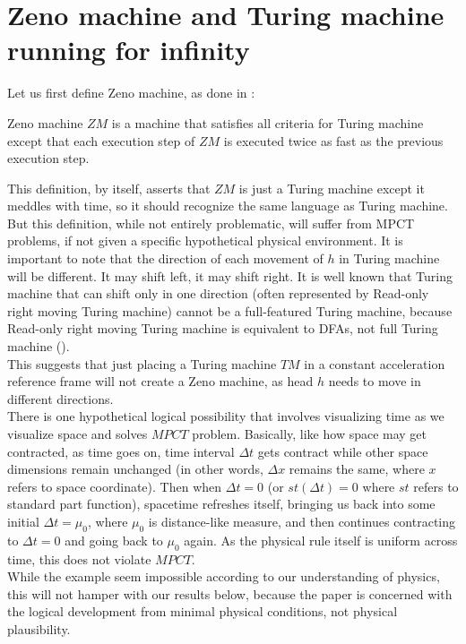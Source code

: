 \documentclass{roffin}
\begin{document}
\section{Zeno machine and Turing machine running for infinity}
Let us first define Zeno machine, as done in \cite{potgieter06}:
\begin{definition}
Zeno machine $ZM$ is a machine that satisfies all criteria for Turing machine except that each execution step of $ZM$ is executed twice as fast as the previous execution step.
\end{definition}
This definition, by itself, asserts that $ZM$ is just a Turing machine except it meddles with time, so it should recognize the same language as Turing machine.\\
But this definition, while not entirely problematic, will suffer from MPCT problems, if not given a specific hypothetical physical environment. It is important to note that the direction of each movement of $h$ in Turing machine will be different. It may shift left, it may shift right. It is well known that Turing machine that can shift only in one direction (often represented by Read-only right moving Turing machine) cannot be a full-featured Turing machine, because Read-only right moving Turing machine is equivalent to DFAs, not full Turing machine (\cite{tucker04}).\\
This suggests that just placing a Turing machine $TM$ in a constant acceleration reference frame will not create a Zeno machine, as head $h$ needs to move in different directions. \\
There is one hypothetical logical possibility that involves visualizing time as we visualize space and solves $MPCT$ problem. Basically, like how space may get contracted, as time goes on, time interval $\Delta t$ gets contract while other space dimensions remain unchanged (in other words, $\Delta x$ remains the same, where $x$ refers to space coordinate). Then when $\Delta t = 0$ (or $st(\Delta t) = 0$ where $st$ refers to standard part function), spacetime refreshes itself, bringing us back into some initial $\Delta t = \mu_0$, where $\mu_0$ is distance-like measure, and then continues contracting to $\Delta t = 0$ and going back to $\mu_0$ again. As the physical rule itself is uniform across time, this does not violate $MPCT$.\\    
While the example seem impossible according to our understanding of physics, this will not hamper with our results below, because the paper is concerned with the logical development from minimal physical conditions, not physical plausibility.\\
\end{document}
